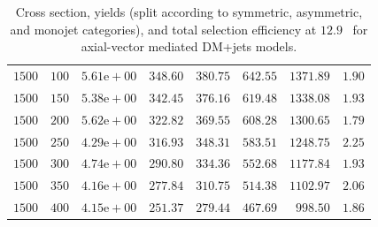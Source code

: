 \begin{table}
{\begin{tabular}{rrlrrrrr}
         $1500$ & $100$ & $5.61\text{e}+00$ &   $348.60$ &    $380.75$ &    $642.55$ &   $1371.89$ & $1.90$ \\
         $1500$ & $150$ & $5.38\text{e}+00$ &   $342.45$ &    $376.16$ &    $619.48$ &   $1338.08$ & $1.93$ \\
         $1500$ & $200$ & $5.62\text{e}+00$ &   $322.82$ &    $369.55$ &    $608.28$ &   $1300.65$ & $1.79$ \\
         $1500$ & $250$ & $4.29\text{e}+00$ &   $316.93$ &    $348.31$ &    $583.51$ &   $1248.75$ & $2.25$ \\
         $1500$ & $300$ & $4.74\text{e}+00$ &   $290.80$ &    $334.36$ &    $552.68$ &   $1177.84$ & $1.93$ \\
         $1500$ & $350$ & $4.16\text{e}+00$ &   $277.84$ &    $310.75$ &    $514.38$ &   $1102.97$ & $2.06$ \\
         $1500$ & $400$ & $4.15\text{e}+00$ &   $251.37$ &    $279.44$ &    $467.69$ &    $998.50$ & $1.86$ \\
        \hline\hline
    \end{tabular}
    }
    \caption{Cross section, yields (split according to symmetric, asymmetric, 
        and monojet categories), and total selection efficiency at $12.9$~\ifb 
        for axial-vector mediated DM+jets models.}
    \label{tab:DMAV_yld}
\end{table}

